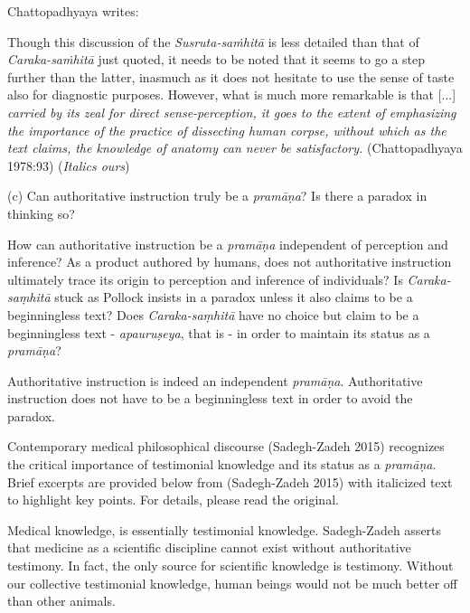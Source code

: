 Chattopadhyaya writes:
\begin{myquote}
Though this discussion of the {\sl Susruta-saṁhitā} is less detailed than that of {\sl Caraka-saṁhitā} just quoted, it needs to be noted that it seems to go a step further than the latter, inasmuch as it does not hesitate to use the sense of taste also for diagnostic purposes.  However, what is much more remarkable is that [...] {\sl carried by its zeal for direct sense-perception, it goes to the extent of emphasizing the importance of the practice of dissecting human corpse, without which as the text claims, the knowledge of anatomy can never be satisfactory.}
\hfill (Chattopadhyaya 1978:93) ({\sl Italics ours})
\end{myquote}

(c) Can authoritative instruction truly be a {{\sl pramāṇa}\relax}?  Is there a paradox in thinking so?

How can authoritative instruction be a {\sl pramāṇa} independent of perception and inference? As a product authored by humans, does not authoritative instruction ultimately trace its origin to perception and inference of individuals? Is {\sl Caraka-saṃhitā} stuck as Pollock insists in a paradox unless it also claims to be a beginningless text?  Does {\sl Caraka-saṃhitā} have no choice but claim to be a beginningless text - {\sl apauruṣeya}, that is - in order to maintain its status as a {\sl pramāṇa}?

Authoritative instruction is indeed an independent {{\sl pramāṇa}\relax}.  Authoritative instruction does not have to be a beginningless text in order to avoid the paradox.

Contemporary medical philosophical discourse (Sadegh-Zadeh 2015) recognizes the critical importance of testimonial knowledge and its status as a {\sl pramāṇa}.  Brief excerpts are provided below from (Sadegh-Zadeh 2015) with italicized text to highlight key points. For details, please read the original.
  
Medical knowledge, is essentially testimonial knowledge. Sadegh-Zadeh  asserts that medicine as a scientific discipline cannot exist without authoritative testimony. In fact, the only source for scientific knowledge is testimony. Without our collective testimonial knowledge, human beings would not be much better off than other animals.  

